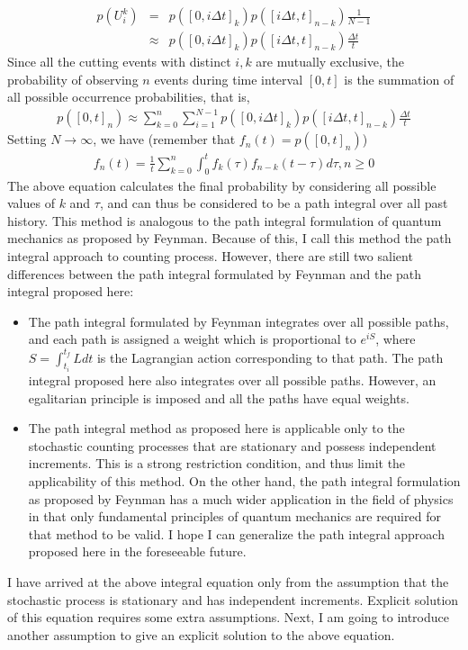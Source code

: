 \documentclass[10pt]{article}
\numberwithin{figure}{section}
\numberwithin{equation}{section}
\begin{document}
\begin{eqnarray}
p(U_{i}^{k}) &=& p([0, i\Delta t]_{k}) p([i\Delta t, t]_{n - k}) \frac{1}{N-1} \\\nonumber
&\approx& p([0, i\Delta t]_{k}) p([i\Delta t, t]_{n - k}) \frac{\Delta t}{t}
\end{eqnarray}
Since all the cutting events with distinct $i, k$ are mutually exclusive, the probability of observing $n$ events during time interval $[0, t]$ is the summation of all possible occurrence probabilities, that is, 
\begin{eqnarray}
p([0, t]_{n}) \approx \sum_{k = 0}^{n} \sum_{i = 1}^{N - 1} p([0, i\Delta t]_{k}) p([i\Delta t, t]_{n - k}) \frac{\Delta t}{t}
\end{eqnarray}
Setting $N \rightarrow \infty$, we have (remember that $f_{n}(t) = p([0, t]_{n})$)
\begin{eqnarray}
f_{n}(t) = \frac{1}{t}\sum_{k = 0}^{n}\int_{0}^{t} f_{k}(\tau) f_{n - k}(t - \tau) d\tau, n \ge 0
\label{probability_equation}
\end{eqnarray}
The above equation calculates the final probability by considering all possible values of $k$ and $\tau$, and can thus be considered to be a path integral over all past history. This method is analogous to the path integral formulation of quantum mechanics as proposed by Feynman\cite{feynman1948space, feynman2010quantum}. Because of this, I call this method the path integral approach to counting process. However, there are still two salient differences between the path integral formulated by Feynman and the path integral proposed here: 
\begin{itemize}
\item The path integral formulated by Feynman integrates over all possible paths, and each path is assigned a weight which is proportional to $e^{iS}$, where $S = \int_{t_{i}}^{t_{f}} L dt$ is the Lagrangian action corresponding to that path. The path integral proposed here also integrates over all possible paths. However, an egalitarian principle is imposed and all the paths have equal weights.  
\item The path integral method as proposed here is applicable only to the stochastic counting processes that are stationary and possess independent increments. This is a strong restriction condition, and thus limit the applicability of this method. On the other hand, the path integral formulation as proposed by Feynman has a much wider application in the field of physics in that only fundamental principles of quantum mechanics are required for that method to be valid. I hope I can generalize the path integral approach proposed here in the foreseeable future. 
\end{itemize}
I have arrived at the above integral equation only from the assumption that the stochastic process is stationary and has independent increments. Explicit solution of this equation requires some extra assumptions. Next, I am going to introduce another assumption to give an explicit solution to the above equation. 
\end{document}
